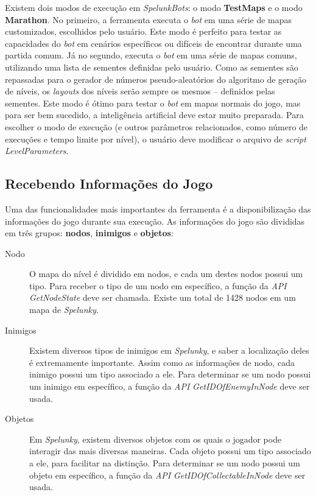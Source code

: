Existem dois modos de execução em \textit{SpelunkBots}: o modo \textbf{TestMaps}
e o modo \textbf{Marathon}. No primeiro, a ferramenta executa o \textit{bot} em
uma série de mapas customizados, escolhidos pelo usuário. Este modo é perfeito
para testar as capacidades do \textit{bot} em cenários específicos ou difíceis
de encontrar durante uma partida comum. Já no segundo, executa o \textit{bot} em
uma série de mapas comuns, utilizando uma lista de sementes definidas pelo
usuário. Como as sementes são repassadas para o gerador de números
pseudo-aleatórios do algoritmo de geração de níveis, os \textit{layouts} dos
níveis serão sempre os mesmos -- definidos pelas sementes. Este modo é ótimo
para testar o \textit{bot} em mapas normais do jogo, mas para ser bem sucedido,
a inteligência artificial deve estar muito preparada. Para escolher o modo de
execução (e outros parâmetros relacionados, como número de execuções e tempo
limite por nível), o usuário deve modificar o arquivo de \textit{script}
\textit{LevelParameters}.


\subsection{Recebendo Informações do Jogo}
Uma das funcionalidades mais importantes da ferramenta é a disponibilização das
informações do jogo durante sua execução. As informações do jogo são divididas
em três grupos: \textbf{nodos}, \textbf{inimigos} e \textbf{objetos}:

\begin{description}
	\item[Nodo]
		O mapa do nível é dividido em nodos, e cada um destes nodos possui um
		tipo.  Para receber o tipo de um nodo em específico, a função da
		\textit{API} \textit{GetNodeState} deve ser chamada. Existe um total de
		1428 nodos em um mapa de \textit{Spelunky}.

	\item[Inimigos]
		Existem diversos tipos de inimigos em \textit{Spelunky}, e saber a
		localização deles é extremamente importante. Assim como as informações
		de nodo, cada inimigo possui um tipo associado a ele. Para determinar se
		um nodo possui um inimigo em específico, a função da \textit{API}
		\textit{GetIDOfEnemyInNode} deve ser usada.

	\item[Objetos]
		Em \textit{Spelunky}, existem diversos objetos com os quais o jogador
		pode interagir das mais diversas maneiras. Cada objeto possui um tipo
		associado a ele, para facilitar na distinção. Para determinar se um nodo
		possui um objeto em específico, a função da \textit{API}
		\textit{GetIDOfCollectableInNode} deve ser usada.
\end{description}

